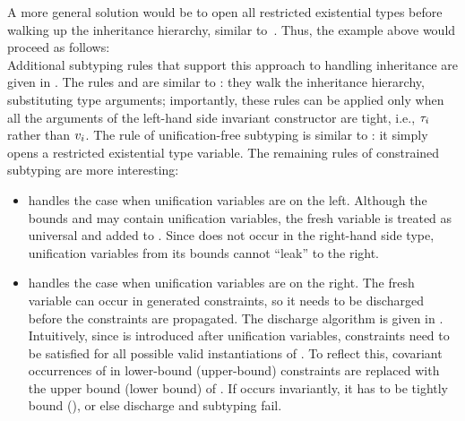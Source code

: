 A more general solution would be to open all restricted existential types
before walking up the inheritance hierarchy, similar
to~\cite{bib:tate:mixed-site:2013}. Thus, the example above would
proceed as follows:\\
Additional subtyping rules that support this approach to handling inheritance
are given in .
The rules  and  are similar to :
they walk the inheritance hierarchy, substituting type arguments;
importantly, these rules can be applied only when all the arguments of the
left-hand side invariant constructor are tight,
i.e., $\tau_i$ rather than $v_i$.
The rule  of unification-free subtyping is similar to
: it simply opens a restricted existential type variable.
The remaining rules of constrained subtyping are more interesting:
\begin{itemize}
    \item {} handles the case when unification variables are on
        the left. Although the bounds \tylb and \tyub may contain unification
        variables, the fresh variable \vx is treated as universal and added
        to \AEnv. Since \vx does not occur in the right-hand side type, 
        unification variables from its bounds cannot ``leak'' to the right.
    \item {} handles the case when unification variables are on
        the right. The fresh variable \vx can occur in generated constraints,
        so it needs to be discharged before the constraints are propagated.
        The discharge algorithm is given in .
        Intuitively, since \vx is introduced after unification variables,
        constraints need to be satisfied for all possible valid instantiations
        of \vx. To reflect this, covariant occurrences of \vx in lower-bound
        (upper-bound) constraints are replaced with the upper bound
        (lower bound) of \vx. If \vx occurs invariantly, it has to be
        tightly bound (\subtydflt{\tyub}{\tylb}), or else discharge 
        and subtyping fail.
\end{itemize}


